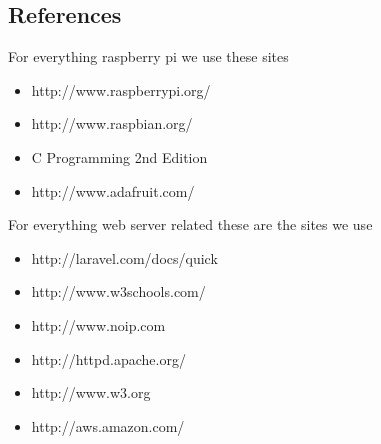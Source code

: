 \documentclass{report}
\begin{document}
\subsection*{References}
For everything raspberry pi we use these sites
\begin{itemize}
	\item http://www.raspberrypi.org/
	\item http://www.raspbian.org/
	\item C Programming 2nd Edition
	\item http://www.adafruit.com/
\end{itemize}
For everything web server related these are the sites we use
\begin{itemize}
	\item http://laravel.com/docs/quick
	\item http://www.w3schools.com/
	\item http://www.noip.com
	\item http://httpd.apache.org/
	\item http://www.w3.org
	\item http://aws.amazon.com/
\end{itemize}
\newpage
\end{document}
